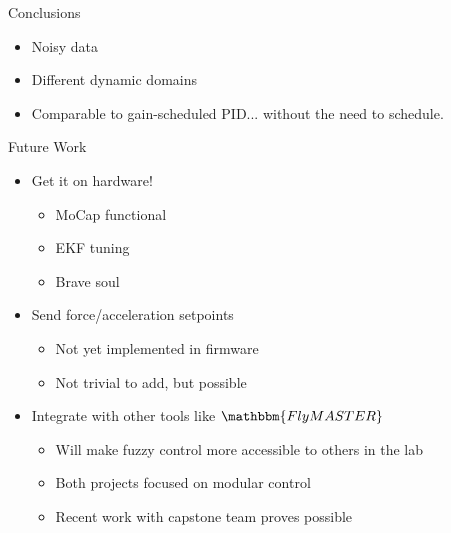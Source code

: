 \documentclass[]{beamer}
\begin{document}
\begin{frame}{Conclusions}
    \begin{itemize}
        \item Noisy data
        \item Different dynamic domains
        \item Comparable to gain-scheduled PID... without the need to schedule.
    \end{itemize}
\end{frame}

\begin{frame}{Future Work}
    \begin{itemize}
        \item Get it on hardware!
            \begin{itemize}
                \item MoCap functional
                \item EKF  tuning
                \item Brave soul
            \end{itemize}
        \item Send force/acceleration setpoints
            \begin{itemize}
                \item Not yet implemented in firmware
                \item Not trivial to add, but possible
            \end{itemize}
        \item Integrate with other tools like $\mathbbm{FlyMASTER}$ 
            \begin{itemize}
                \item Will make fuzzy control more accessible to others in the lab
                \item Both projects focused on modular control
                \item Recent work with capstone team proves possible
            \end{itemize}
    \end{itemize}
\end{frame}
\end{document}
